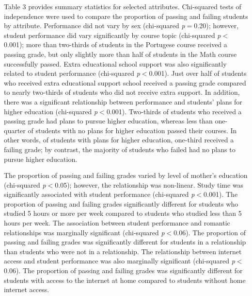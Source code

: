 \documentclass[sigconf]{acmart}
\begin{document}
Table 3 provides summary statistics for selected attributes. Chi-squared tests 
of independence were used to compare the proportion of passing and failing 
students by attribute. Performance did not vary by sex (chi-squared 
\textit{p}$=$0.20); however, student performance did vary significantly by 
course topic (chi-squared \textit{p}$<$0.001); more than two-thirds of students 
in the Portugese course received a passing grade, but only slightly more than 
half of students in the Math course successfully passed. Extra educational 
school support was also significantly related to student performance 
(chi-squared \textit{p}$<$0.001). Just over half of students who received 
extra educational support school received a passing grade compared to nearly 
two-thirds of students who did not receive extra support. In addition, there 
was a significant relationship between performance and students' plans for 
higher education (chi-squared \textit{p}$<$0.001). Two-thirds of students 
who received a passing grade had plans to pursue higher education, whereas 
less than one-quarter of students with no plans for higher education passed 
their courses. In other words, of students with plans for higher education, 
one-third received a failing grade; by contrast, the majority of students who 
failed had no plans to pursue higher education. 


The proportion of passing and failing grades varied by level of mother's 
education (chi-squared \textit{p}$<$0.05); however, the relationship was 
non-linear. Study time was significantly associated with student performance 
(chi-squared \textit{p}$<$0.001). The proportion of passing and failing 
grades significantly different for students who studied 5 hours or more 
per week compared to students who studied less than 5 hours per week. 
The association between student performance and romantic relationships
was marginally significant (chi-squared \textit{p}$<$0.06). The proportion 
of passing and failing grades was significantly different for students in 
a relationship than students who were not in a relationship. The relationship 
between internet access and student performance was also marginally significant 
(chi-squared \textit{p}$<$0.06). The proportion of passing and failing grades 
was significantly different for students with access to the internet at home
compared to students without home internet access.

\end{document}
